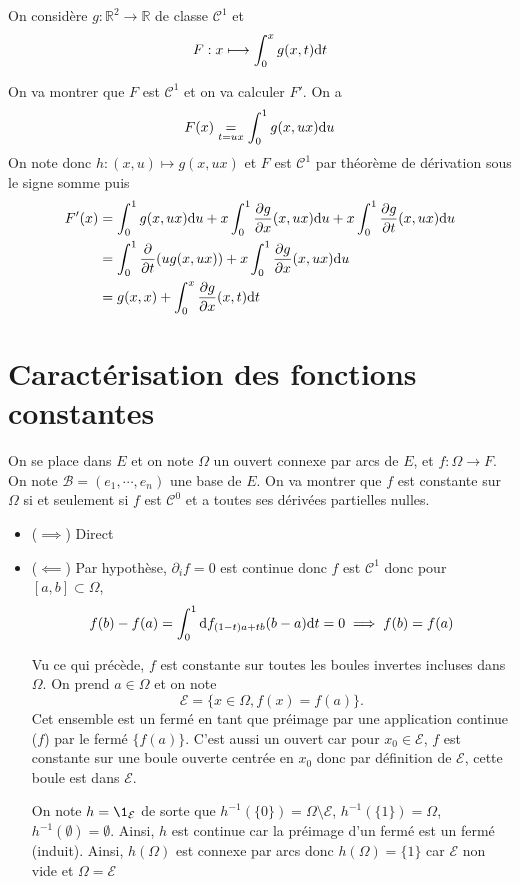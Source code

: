 On considère $g:\mathbb R^2\to \mathbb R$ de classe $\mathcal C^1$ et \[
    F:x\longmapsto \int_0^xg(x, t)\mathrm{d} t
\]

On va montrer que $F$ est $\mathcal C^1$ et on va calculer $F'$.
On a \[
    F(x) \underset{t=ux}=\int_0^1g(x, ux)\mathrm{d} u
\]
On note donc $h: (x, u) \longmapsto g(x, ux)$ et $F$ est $\mathcal C^1$ par théorème de dérivation sous le signe somme puis \begin{align*}
    F'(x)&=\int_0^1 g(x, ux)\mathrm{d} u+x\int_0^1\frac{\partial g}{\partial x}(x, ux)\mathrm{d} u+x\int_0^1\frac{\partial g}{\partial t}(x, ux)\mathrm{d} u \\
         &= \int_0^1\frac{\partial}{\partial t}(ug(x, ux))+x\int_0^1 \frac{\partial g}{\partial x} (x, ux)\mathrm{d} u \\ &= g(x, x)+\int_0^x \frac{\partial g}{\partial x}(x, t)\mathrm{d} t
\end{align*}

\section{Caractérisation des fonctions constantes}

On se place dans $E$ et on note $\Omega$ un ouvert connexe par arcs de $E$, et $f:\Omega \to F$. On note $\mathcal B=(e_1, \cdots, e_n)$ une base de $E$. On va montrer que $f$ est constante sur $\Omega$ si et seulement si $f$ est $\mathcal C^0$ et a toutes ses dérivées partielles nulles.

\begin{itemize}
    \item ($\implies$) Direct
    \item ($\impliedby$) Par hypothèse, $\partial_if =0$ est continue donc $f$ est $\mathcal C^1$ donc pour $[a, b]\subset \Omega$, \[
            f(b)-f(a)=\int_0^1\mathrm{d} f_{(1-t)a+tb}(b-a)\mathrm{d} t=0\implies f(b)=f(a)
        \]

        Vu ce qui précède, $f$ est constante sur toutes les boules invertes incluses dans $\Omega$. On prend $a\in\Omega$ et on note \[
            \mathcal E=\{x\in\Omega, f(x)=f(a)\}.
        \]
        Cet ensemble est un fermé en tant que préimage par une application continue ($f$) par le fermé $\{f(a)\}$. C'est aussi un ouvert car pour $x_0\in\mathcal E$, $f$ est constante sur une boule ouverte centrée en $x_0$ donc par définition de $\mathcal E$, cette boule est dans $\mathcal E$.

        On note $h=\1_{\mathcal E}$ de sorte que $h^{-1}(\{0\})=\Omega\setminus \mathcal E$, $h^{-1}(\{1\})=\Omega$, $h^{-1}(\emptyset)=\emptyset$. Ainsi, $h$ est continue car la préimage d'un fermé est un fermé (induit). Ainsi, $h(\Omega)$ est connexe par arcs donc $h(\Omega)=\{1\}$ car $\mathcal E$ non vide et $\Omega=\mathcal E$
\end{itemize}


